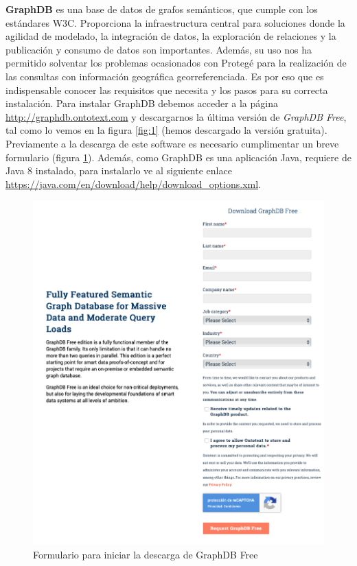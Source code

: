 \textbf{GraphDB} es una base de datos de grafos semánticos, que cumple con los estándares W3C. Proporciona la infraestructura central para soluciones donde la agilidad de modelado, la integración de datos, la exploración de relaciones y la publicación y consumo de datos son importantes. Además, su uso nos ha permitido solventar los problemas ocasionados con Protegé para la realización de las consultas con información geográfica georreferenciada. Es por eso que es indispensable conocer las requisitos que necesita y los pasos para su correcta instalación. Para instalar GraphDB debemos acceder a la página \url{http://graphdb.ontotext.com} y descargarnos la última versión de \textit{GraphDB Free}, tal como lo vemos en la figura \ref{fig:1} (hemos descargado la versión gratuita). Previamente a la descarga de este software es necesario cumplimentar un breve formulario (figura \ref{fig:3}). Además, como GraphDB es una aplicación Java, requiere de Java 8 instalado, para instalarlo ve al siguiente enlace \url{https://java.com/en/download/help/download_options.xml}.



\begin{figure}[H]
	\centering
	\includegraphics[width=0.82\linewidth]{imagenes/apendices/3}
	\caption{Formulario para iniciar la descarga de GraphDB Free}
	\label{fig:3}
\end{figure}


